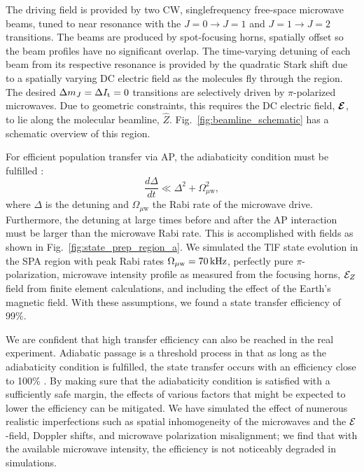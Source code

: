 The driving field is provided by two CW, single\hyph frequency free-space microwave beams, tuned to near resonance with the $J=0\rightarrow J=1$ and $J=1\rightarrow J=2$ transitions. The beams are produced by spot-focusing horns, spatially offset so the beam profiles have no significant overlap. The time-varying detuning of each beam from its respective resonance is provided by the quadratic Stark shift due to a spatially varying DC electric field as the molecules fly through the region. The desired $\Delta m_J=\Delta I_\text{t}=0$ transitions are selectively driven by $\pi$-polarized microwaves. Due to geometric constraints, this requires the DC electric field, $\bm{\mathcal{E}}$, to lie along the molecular beamline, $\hat{Z}$. Fig.~\ref{fig:beamline_schematic} has a schematic overview of this region.

For efficient population transfer via AP, the adiabaticity condition must be fulfilled \cite{budker2004atomic}:
\begin{equation}
	\frac{d\Delta}{dt} \ll \Delta^2 + \Omega_\text{$\mu$w}^2,
\end{equation}
where $\Delta$ is the detuning and $\Omega_\text{$\mu$w}$ the Rabi rate of the microwave drive. Furthermore, the detuning at large times before and after the AP interaction must be larger than the microwave Rabi rate. This is accomplished with fields as shown in Fig.~\ref{fig:state_prep_region_a}.
We simulated the TlF state evolution in the SPA region with peak Rabi rates $\Omega_\text{$\mu$w}=70\,\mathrm{kHz}$, perfectly pure $\pi$-polarization, microwave intensity profile as measured from the focusing horns, $\mathcal{E}_Z$ field from finite element calculations, and including the effect of the Earth's magnetic field. With these assumptions, we found a state transfer efficiency of 99\%.

We are confident that high transfer efficiency can also be reached in the real experiment. Adiabatic passage is a threshold process in that as long as the adiabaticity condition is fulfilled, the state transfer occurs with an efficiency close to 100\% \cite{budker2004atomic}. 
By making sure that the adiabaticity condition is satisfied with a sufficiently safe margin, the effects of various factors that might be expected to lower the efficiency can be mitigated. We have simulated the effect of numerous realistic imperfections such as spatial inhomogeneity of the microwaves and the $\mathcal{E}$-field, Doppler shifts, and microwave polarization misalignment; we find that with the available microwave intensity, the efficiency is not noticeably degraded in simulations.

